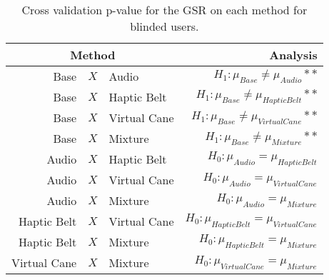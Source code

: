 
\begin{table}[!htb]
\centering
\caption{Cross validation p-value for the GSR on each method for blinded users.}
\label{tab:lsd_gsr}
\begin{tabular}{rclr}
\toprule
      \multicolumn{3}{c}{Method} &                                       Analysis \\
\midrule
              Base & $X$ & Audio &           $H_1 : \mu_{Base} \ne \mu_{Audio}**$ \\
        Base & $X$ & Haptic Belt &     $H_1 : \mu_{Base} \ne \mu_{Haptic Belt}**$ \\
       Base & $X$ & Virtual Cane &    $H_1 : \mu_{Base} \ne \mu_{Virtual Cane}**$ \\
            Base & $X$ & Mixture &         $H_1 : \mu_{Base} \ne \mu_{Mixture}**$ \\
       Audio & $X$ & Haptic Belt &        $H_0 : \mu_{Audio} = \mu_{Haptic Belt}$ \\
      Audio & $X$ & Virtual Cane &       $H_0 : \mu_{Audio} = \mu_{Virtual Cane}$ \\
           Audio & $X$ & Mixture &            $H_0 : \mu_{Audio} = \mu_{Mixture}$ \\
Haptic Belt & $X$ & Virtual Cane & $H_0 : \mu_{Haptic Belt} = \mu_{Virtual Cane}$ \\
     Haptic Belt & $X$ & Mixture &      $H_0 : \mu_{Haptic Belt} = \mu_{Mixture}$ \\
    Virtual Cane & $X$ & Mixture &     $H_0 : \mu_{Virtual Cane} = \mu_{Mixture}$ \\
\bottomrule
\end{tabular}
\end{table}

